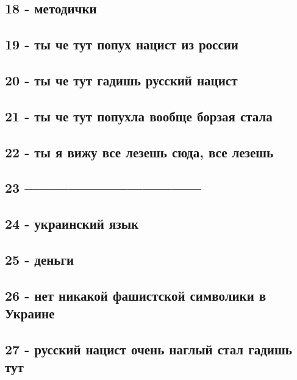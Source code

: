 \subsection{18 - методички}

\subsection{19 - ты че тут попух нацист из россии}

\subsection{20 - ты че тут гадишь русский нацист}

\subsection{21 - ты че тут попухла вообще борзая стала}

\subsection{22 - ты я вижу все лезешь сюда, все лезешь}

\subsection{23 ------------------------------------}

\subsection{24 - украинский язык}

\subsection{25 - деньги}

\subsection{26 - нет никакой фашистской символики в Украине}

\subsection{27 - русский нацист очень наглый стал гадишь тут}

